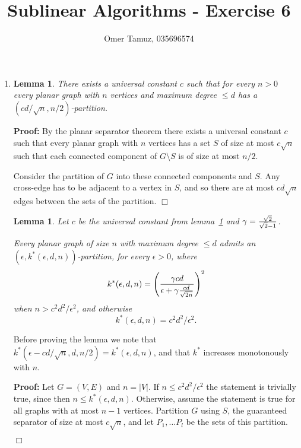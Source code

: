 \documentclass[11pt]{article} \usepackage{amssymb}
\newtheorem{lemma}[theorem]{Lemma}
\newenvironment{proof}{\noindent \textbf{Proof:}}{$\Box$}
\newcommand{\eps}{\epsilon} \newcommand{\lam}{\lambda}
\begin{document}
\title{Sublinear Algorithms - Exercise 6}

 \author{Omer Tamuz, 035696574}
\maketitle
\begin{enumerate}
\item

  \begin{lemma}
    \label{lemma:cut}
    There exists a universal constant $c$ such that for every $n>0$
    every planar graph with $n$ vertices and maximum degree $\leq d$
    has a $(cd/\sqrt{n},n/2)$-partition.
  \end{lemma}
  \begin{proof}
    By the planar separator theorem there exists a universal constant
    $c$ such that every planar graph with $n$ vertices has a set $S$
    of size at most $c\sqrt{n}$ such that each connected component of
    $G\setminus S$ is of size at most $n/2$.

    Consider the partition of $G$ into these connected components and
    $S$. Any cross-edge has to be adjacent to a vertex in $S$, and so
    there are at most $cd\sqrt{n}$ edges between the sets of the
    partition.
  \end{proof}

  \begin{lemma}
    Let $c$ be the universal constant from lemma~\ref{lemma:cut} and
    $\gamma = {\sqrt{2}\over \sqrt{2}-1}$.
    
    Every planar graph of size $n$ with maximum degree $\leq d$ admits
    an $(\eps, k^*(\eps, d, n))$-partition, for every $\eps > 0$, where
    \begin{equation*}
      k^*(\eps, d, n)=\left({\gamma cd \over \eps+\gamma {cd \over \sqrt{2n}}}\right)^2
    \end{equation*}
    when $n>c^2d^2/\eps^2$, and otherwise
    \begin{equation*}
      k^*(\eps, d, n)=c^2d^2/\eps^2.
    \end{equation*}
  \end{lemma}
  Before proving the lemma we note that $k^*(\eps-cd/\sqrt{n}, d,
  n/2)=k^*(\eps, d, n)$, and that $k^*$ increases monotonously with $n$.

  
  \begin{proof}
    Let $G=(V,E)$ and $n=|V|$. If $n \leq c^2d^2/\eps^2$ the statement is
    trivially true, since then $n \leq k^*(\eps, d, n)$. Otherwise,
    assume the statement is true for all graphs with at most $n-1$
    vertices. Partition $G$ using $S$, the guaranteed separator of
    size at most $c\sqrt{n}$, and let $P_1,\ldots P_l$ be the sets of
    this partition.


\end{proof}
\end{enumerate}
\end{document}
